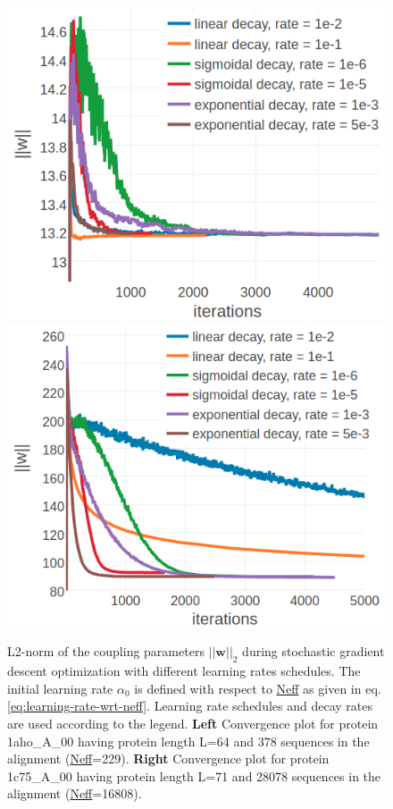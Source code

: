 \documentclass[11pt,a4paper,twoside]{book}
\newcommand{\w}{\mathbf{w}}
\theoremstyle{definition}
\theoremstyle{definition}
\theoremstyle{remark}
\begin{document}
\begin{figure}

{\centering \includegraphics[width=0.48\linewidth]{img/full_likelihood/sgd/parameter_norm_1ahoa00_alpha0_different_schedules} \includegraphics[width=0.48\linewidth]{img/full_likelihood/sgd/parameter_norm_1c75a00_alpha0_different_schedules} 

}

\caption{L2-norm of the
coupling parameters \(||\w||_2\) during stochastic gradient descent
optimization with different learning rates schedules. The initial
learning rate \(\alpha_0\) is defined with respect to
\protect\hyperlink{abbrev}{Neff} as given in eq.
\eqref{eq:learning-rate-wrt-neff}. Learning rate schedules and decay rates
are used according to the legend. \textbf{Left} Convergence plot for
protein 1aho\_A\_00 having protein length L=64 and 378 sequences in the
alignment (\protect\hyperlink{abbrev}{Neff}=229). \textbf{Right}
Convergence plot for protein 1c75\_A\_00 having protein length L=71 and
28078 sequences in the alignment
(\protect\hyperlink{abbrev}{Neff}=16808).}\label{fig:sgd-single-proteins-learning-rate-schedule}
\end{figure}
\end{document}
